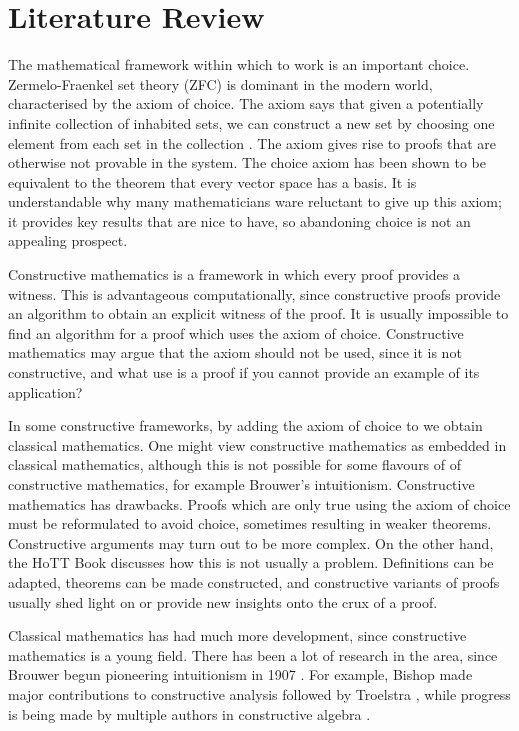 \documentclass[ProjectReport]{subfiles}
\begin{document}
\section{Literature Review}
The mathematical framework within which to work is an important choice. Zermelo-Fraenkel set theory (ZFC) is dominant in the modern world, characterised by the axiom of choice. The axiom says that given a potentially infinite collection of inhabited sets, we can construct a new set by choosing one element from each set in the collection \cite{choiceaxiom}. The axiom gives rise to proofs that are otherwise not provable in the system. The choice axiom has been shown to be equivalent to the theorem that every vector space has a basis. It is understandable why many mathematicians ware reluctant to give up this axiom; it provides key results that are nice to have, so abandoning choice is not an appealing prospect. 

Constructive mathematics is a framework in which every proof provides a witness. This is advantageous computationally, since constructive proofs provide an algorithm to obtain an explicit witness of the proof. It is usually impossible to find an algorithm for a proof which uses the axiom of choice. Constructive mathematics may argue that the axiom should not be used, since it is not constructive, and what use is a proof if you cannot provide an example of its application? 

In some constructive frameworks, by adding the axiom of choice to we obtain classical mathematics. One might view constructive mathematics as embedded in classical mathematics, although this is not possible for some flavours of of constructive mathematics, for example Brouwer's intuitionism. Constructive mathematics has drawbacks. Proofs which are only true using the axiom of choice must be reformulated to avoid choice, sometimes resulting in weaker theorems. Constructive arguments may turn out to be more complex. On the other hand, the HoTT Book \cite[Introduction - Constructivity]{hottbook} discusses how this is not usually a problem. Definitions can be adapted, theorems can be made constructed, and constructive variants of proofs usually shed light on or provide new insights onto the crux of a proof.

Classical mathematics has had much more development, since constructive mathematics is a young field. There has been a lot of research in the area, since Brouwer begun pioneering intuitionism in 1907 \cite{Brouwer}. For example, Bishop made major contributions to constructive analysis \cite{Bishop1987-BISCA-2} followed by Troelstra \cite{Troelstra1973-TROMIO}, while progress is being made by multiple authors in constructive algebra \cite{2015}. 
\end{document}
